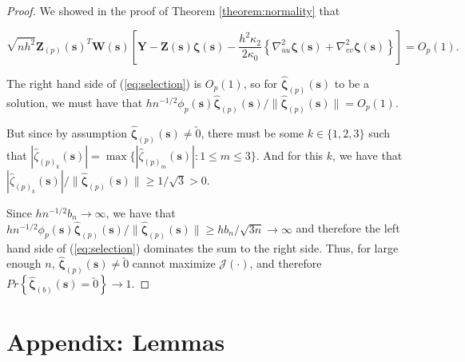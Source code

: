 \documentclass[authoryear,review, 12pt]{elsarticle}
\begin{document}
\begin{proof}
We showed in the proof of Theorem \ref{theorem:normality} that

\[
\sqrt{nh^{2}}\bm{Z}_{\left(p\right)}\left(\bm{s}\right)^{T}\bm{W}\left(\bm{s}\right)\left[\bm{Y}-\bm{Z}\left(\bm{s}\right)\bm{\zeta}\left(\bm{s}\right)-\frac{h^{2}\kappa_{2}}{2\kappa_{0}}\left\{ \nabla_{uu}^{2}\bm{\zeta}\left(\bm{s}\right)+\nabla_{vv}^{2}\bm{\zeta}\left(\bm{s}\right)\right\} \right]=O_{p}\left(1\right).
\]


The right hand side of (\ref{eq:selection}) is $O_{p}(1)$, so for
$\hat{\bm{\zeta}}_{\left(p\right)}\left(\bm{s}\right)$ to be a solution,
we must have that $hn^{-1/2}\phi_{p}\left(\bm{s}\right)\hat{\bm{\zeta}}_{\left(p\right)}\left(\bm{s}\right)/\|\hat{\bm{\zeta}}_{\left(p\right)}\left(\bm{s}\right)\|=O_{p}\left(1\right)$.

But since by assumption $\hat{\bm{\zeta}}_{\left(p\right)}\left(\bm{s}\right)\ne\utilde{0}$,
there must be some $k\in\{1,2,3\}$ such that $|\hat{\zeta}_{\left(p\right)_{k}}\left(\bm{s}\right)|=\max\{|\hat{\zeta}_{\left(p\right)_{m}}\left(\bm{s}\right)|:1\le m\le3\}$.
And for this $k$, we have that $|\hat{\zeta}_{\left(p\right)_{k}}\left(\bm{s}\right)|/\|\hat{\bm{\zeta}}_{\left(p\right)}\left(\bm{s}\right)\|\ge1/\sqrt{3}>0$.

Since $hn^{-1/2}b_{n}\to\infty$, we have that $hn^{-1/2}\phi_{p}\left(\bm{s}\right)\hat{\bm{\zeta}}_{\left(p\right)}\left(\bm{s}\right)/\|\hat{\bm{\zeta}}_{\left(p\right)}\left(\bm{s}\right)\|\ge hb_{n}/\sqrt{3n}\to\infty$
and therefore the left hand side of (\ref{eq:selection}) dominates
the sum to the right side. Thus, for large enough $n$, $\hat{\bm{\zeta}}_{\left(p\right)}\left(\bm{s}\right)\ne\utilde{0}$
cannot maximize $\mathcal{J}\left(\cdot\right)$, and therefore $Pr\left\{ \hat{\bm{\zeta}}_{(b)}\left(\bm{s}\right)=\utilde{0}\right\} \to1$. 
\end{proof}

\section*{Appendix: Lemmas}
\end{document}
